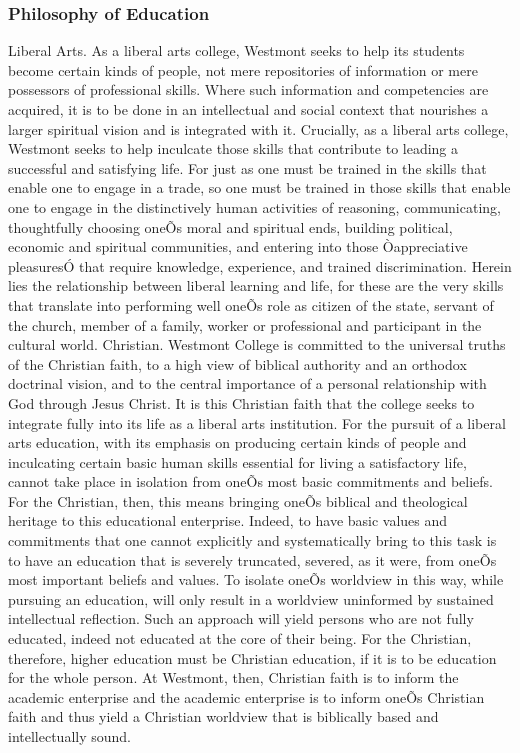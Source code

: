 \documentclass[letterpaper, 11pt]{article}
\begin{document}
\subsubsection{Philosophy of Education}
   Liberal Arts.  As a liberal arts college, Westmont seeks to help its students become certain kinds of people, not mere repositories of information or mere possessors of professional skills.  Where such information and competencies are acquired, it is to be done in an intellectual and social context that nourishes a larger spiritual vision and is integrated with it.  Crucially, as a liberal arts college, Westmont seeks to help inculcate those skills that contribute to leading a successful and satisfying life.  For just as one must be trained in the skills that enable one to engage in a trade, so one must be trained in those skills that enable one to engage in the distinctively human activities of reasoning, communicating, thoughtfully choosing oneÕs moral and spiritual ends, building political, economic and spiritual communities, and entering into those Òappreciative pleasuresÓ that require knowledge, experience, and trained discrimination. Herein lies the relationship between liberal learning and life, for these are the very skills that translate into performing well oneÕs role as citizen of the state, servant of the church, member of a family, worker or professional and participant in the cultural world.
   Christian.  Westmont College is committed to the universal truths of the Christian faith, to a high view of biblical authority and an orthodox doctrinal vision, and to the central importance of a personal relationship with God through Jesus Christ.  It is this Christian faith that the college seeks to integrate fully into its life as a liberal arts institution.  For the pursuit of a liberal arts education, with its emphasis on producing certain kinds of people and inculcating certain basic human skills essential for living a satisfactory life, cannot take place in isolation from oneÕs most basic commitments and beliefs.  For the Christian, then, this means bringing oneÕs biblical and theological heritage to this educational enterprise. Indeed, to have basic values and commitments that one cannot explicitly and systematically bring to this task is to have an education that is severely truncated, severed, as it were, from oneÕs most important beliefs and values.  To isolate oneÕs worldview in this way, while pursuing an education, will only result in a worldview uninformed by sustained intellectual reflection.  Such an approach will yield persons who are not fully educated, indeed not educated at the core of their being.  For the Christian, therefore, higher education must be Christian education, if it is to be education for the whole person.  At Westmont, then, Christian faith is to inform the academic enterprise and the academic enterprise is to inform oneÕs Christian faith and thus yield a Christian worldview that is biblically based and intellectually sound. 
\end{document}
